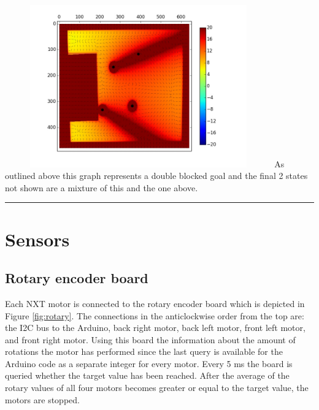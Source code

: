 \documentclass[a4paper,12pt]{article}
\begin{document}
\begin{minipage}{0.5\textwidth}
\includegraphics[height=70mm,width=115mm]{p5.jpg}\newline
As outlined above this graph represents a double blocked goal and the final 2 states not shown are a mixture of this and the one above.
\end{minipage}\newline\newline
\rule{\textwidth}{1pt}\newline
 

\section{Sensors}
\subsection{Rotary encoder board}

Each NXT motor is connected to the rotary encoder board which is depicted in Figure \ref{fig:rotary}. The connections in the anticlockwise order from the top are: the I2C bus to the Arduino, back right motor, back left motor, front left motor, and front right motor. Using this board the information about the amount of rotations the motor has performed since the last query is available for the Arduino code as a separate integer for every motor. Every 5 ms the board is queried whether the target value has been reached. After the average of the rotary values of all four motors becomes greater or equal to the target value, the motors are stopped.
\end{document}
